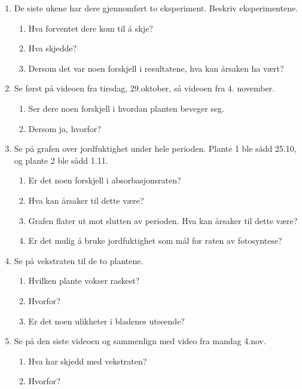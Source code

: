 \begin{enumerate}
	\item De siste ukene har dere gjennomført to eksperiment. Beskriv eksperimentene.
	\begin{enumerate}
		\item Hva forventet dere kom til å skje?
		\item Hva skjedde?
		\item Dersom det var noen forskjell i resultatene, hva kan årsaken ha vært?
	\end{enumerate}

	\item Se først på videoen fra tirsdag, 29.oktober, så videoen fra 4. november. 
	\begin{enumerate}
		\item Ser dere noen forskjell i hvordan planten beveger seg. 
		\item Dersom ja, hvorfor?
	\end{enumerate}

	\item Se på grafen over jordfuktighet under hele perioden. Plante 1 ble sådd 25.10, og plante 2 ble sådd 1.11. 
	\begin{enumerate}
		\item Er det noen forskjell i absorbasjonsraten?
		\item Hva kan årsaker til dette være?
		\item Grafen flater ut mot slutten av perioden. Hva kan årsaker til dette være?
		\item Er det mulig å bruke jordfuktighet som mål for raten av fotosyntese?
	\end{enumerate}

	\item Se på vekstraten til de to plantene. 
	\begin{enumerate}
		\item Hvilken plante vokser raskest?
		\item Hvorfor?
		\item Er det noen ulikheter i bladenes utseende?
	\end{enumerate}

	\item Se på den siste videoen og sammenlign med video fra mandag 4.nov.
	\begin{enumerate}
		\item Hva har skjedd med vekstraten?
		\item Hvorfor?
	\end{enumerate}
\end{enumerate}

